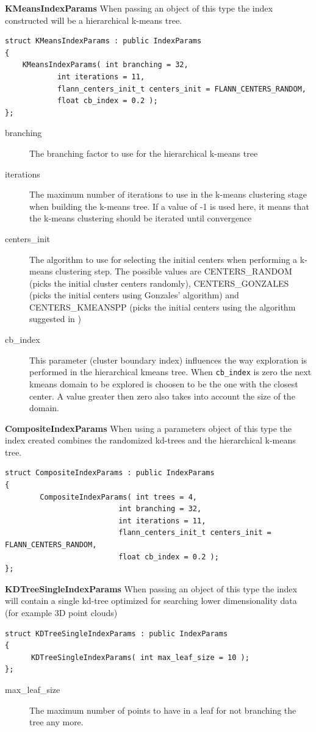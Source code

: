 \documentclass[letter,10pt]{article}
\begin{document}
\begin{description}
\textbf{KMeansIndexParams} When passing an object of this type the index constructed will be a hierarchical k-means tree. 
\begin{Verbatim}[fontsize=\footnotesize]
struct KMeansIndexParams : public IndexParams
{
	KMeansIndexParams( int branching = 32,
			int iterations = 11,
			flann_centers_init_t centers_init = FLANN_CENTERS_RANDOM,
			float cb_index = 0.2 );
};
\end{Verbatim}
\begin{description}
\item[branching]{ The branching factor to use for the hierarchical k-means tree }
\item[iterations]{ The maximum number of iterations to use in the k-means clustering 
		    stage when building the k-means tree. If a value of -1 is used here, it means
		    that the k-means clustering should be iterated until convergence}
\item[centers\_init]{ The algorithm to use for selecting the initial
		  centers when performing a k-means clustering step. The possible values are
		  CENTERS\_RANDOM (picks the initial cluster centers randomly), CENTERS\_GONZALES (picks the
		  initial centers using Gonzales' algorithm) and CENTERS\_KMEANSPP (picks the initial
		centers using the algorithm suggested in \cite{arthur_kmeanspp_2007}) }
\item[cb\_index]{ This parameter (cluster boundary index) influences the
		  way exploration is performed in the hierarchical kmeans tree. When \texttt{cb\_index} is zero
		  the next kmeans domain to be explored is choosen to be the one with the closest center. 
		  A value greater then zero also takes into account the size of the domain.}
\end{description}


\textbf{CompositeIndexParams} When using a parameters object of this type the index created combines the randomized
kd-trees 
        and the hierarchical k-means tree.
\begin{Verbatim}[fontsize=\footnotesize]
struct CompositeIndexParams : public IndexParams
{
        CompositeIndexParams( int trees = 4,
                          int branching = 32,
                          int iterations = 11,
                          flann_centers_init_t centers_init = FLANN_CENTERS_RANDOM, 
                          float cb_index = 0.2 );
};
\end{Verbatim}


\textbf{KDTreeSingleIndexParams} When passing an object of this type the index will contain a single kd-tree
optimized for searching lower dimensionality data (for example 3D point clouds)
\begin{Verbatim}[fontsize=\footnotesize]
struct KDTreeSingleIndexParams : public IndexParams
{
      KDTreeSingleIndexParams( int max_leaf_size = 10 );
};
\end{Verbatim}
\begin{description}
 \item[max\_leaf\_size] The maximum number of points to have in a leaf for not branching the tree any more.
\end{description}


\end{description}
\end{document}
